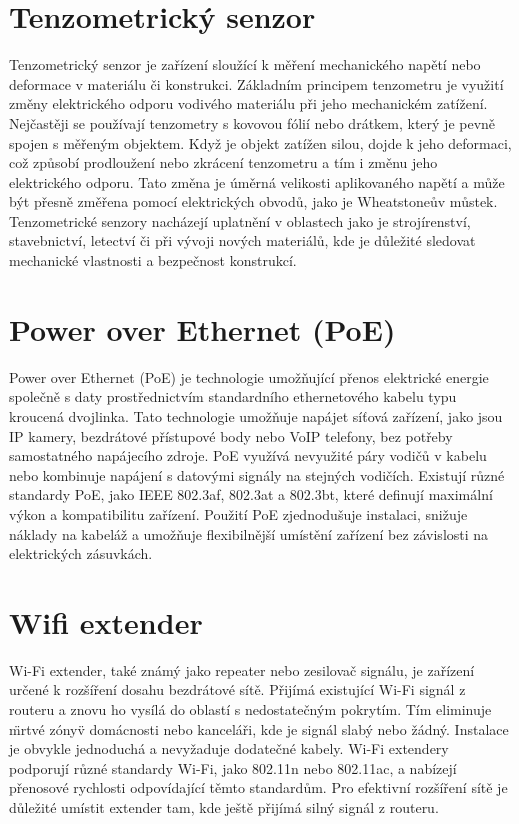 \section{Tenzometrický senzor}\label{sec:tenzo}
Tenzometrický senzor je zařízení sloužící k měření mechanického napětí nebo deformace v materiálu či konstrukci. Základním principem tenzometru je využití změny elektrického odporu vodivého materiálu při jeho mechanickém zatížení. Nejčastěji se používají tenzometry s kovovou fólií nebo drátkem, který je pevně spojen s měřeným objektem. Když je objekt zatížen silou, dojde k jeho deformaci, což způsobí prodloužení nebo zkrácení tenzometru a tím i změnu jeho elektrického odporu. Tato změna je úměrná velikosti aplikovaného napětí a může být přesně změřena pomocí elektrických obvodů, jako je Wheatstoneův můstek. Tenzometrické senzory nacházejí uplatnění v oblastech jako je strojírenství, stavebnictví, letectví či při vývoji nových materiálů, kde je důležité sledovat mechanické vlastnosti a bezpečnost konstrukcí.


\section{Power over Ethernet (PoE)}\label{sec:poe}
Power over Ethernet (PoE) je technologie umožňující přenos elektrické energie společně s daty prostřednictvím standardního ethernetového kabelu typu kroucená dvojlinka. Tato technologie umožňuje napájet síťová zařízení, jako jsou IP kamery, bezdrátové přístupové body nebo VoIP telefony, bez potřeby samostatného napájecího zdroje. PoE využívá nevyužité páry vodičů v kabelu nebo kombinuje napájení s datovými signály na stejných vodičích. Existují různé standardy PoE, jako IEEE 802.3af, 802.3at a 802.3bt, které definují maximální výkon a kompatibilitu zařízení. Použití PoE zjednodušuje instalaci, snižuje náklady na kabeláž a umožňuje flexibilnější umístění zařízení bez závislosti na elektrických zásuvkách.


\section{Wifi extender}\label{sec:wifi-extender}
Wi-Fi extender, také známý jako repeater nebo zesilovač signálu, je zařízení určené k rozšíření dosahu bezdrátové sítě. Přijímá existující Wi-Fi signál z routeru a znovu ho vysílá do oblastí s nedostatečným pokrytím. Tím eliminuje \"mrtvé zóny\" v domácnosti nebo kanceláři, kde je signál slabý nebo žádný. Instalace je obvykle jednoduchá a nevyžaduje dodatečné kabely. Wi-Fi extendery podporují různé standardy Wi-Fi, jako 802.11n nebo 802.11ac, a nabízejí přenosové rychlosti odpovídající těmto standardům. Pro efektivní rozšíření sítě je důležité umístit extender tam, kde ještě přijímá silný signál z routeru.



